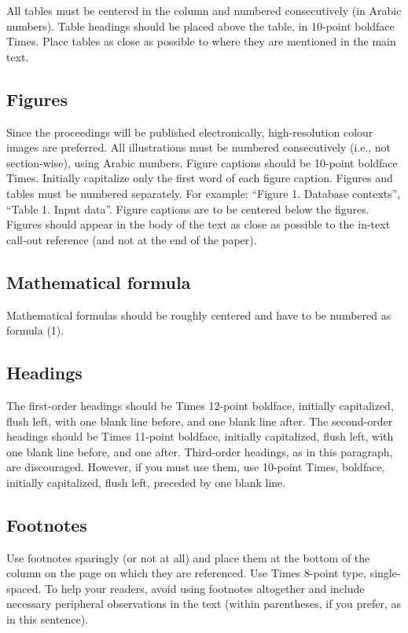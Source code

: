 \documentclass[letter,twocolumn]{article}
\begin{document}
All tables must be centered in the column and numbered consecutively (in Arabic numbers). Table headings should be placed above the table, in 10-point boldface Times. Place tables as close as possible to where they are mentioned in the main text.

\subsection{Figures}
Since the proceedings will be published electronically, high-resolution colour images are preferred. All illustrations must be numbered consecutively (i.e., not section-wise), using Arabic numbers. Figure captions should be 10-point boldface Times. Initially capitalize only the first word of each figure caption. Figures and tables must be numbered separately. For example: ``Figure 1. Database contexts'', ``Table 1. Input data''. Figure captions  are to be centered below the figures. Figures should appear in the body of the text as close as possible to the in-text call-out reference (and not at the end of the paper).

\subsection{Mathematical formula}
Mathematical formulas should be roughly centered and have to be numbered as formula (1).

\subsection{Headings}
The first-order headings should be Times 12-point boldface, initially capitalized, flush left, with one blank line before, and one blank line after. The second-order headings should be Times 11-point boldface, initially capitalized, flush left, with one blank line before, and one after. Third-order headings, as in this paragraph, are discouraged. However, if you must use them, use 10-point Times, boldface, initially capitalized, flush left, preceded by one blank line.

\subsection{Footnotes}
Use footnotes sparingly (or not at all) and place them at the bottom of the column on the page on which they are referenced. Use Times 8-point type, single-spaced. To help your readers, avoid using footnotes altogether and include necessary peripheral observations in the text (within parentheses, if you prefer, as in this sentence).
\end{document}
